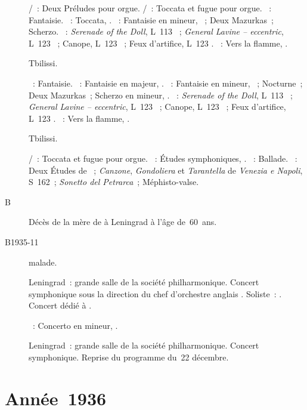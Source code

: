 \begin{description}
 \textsc{\JBach{}/\Ziloti{}}~: Deux Préludes pour orgue.
 \textsc{\JBach{}/\Busoni{}}~: Toccata et fugue pour orgue.
 \textsc{\Mozart{}}~: Fantaisie.
 \textsc{\Schumann{}}~: Toccata, .
 \textsc{\Chopin{}}~: Fantaisie en \kF mineur, ~; Deux Mazurkas~;
 Scherzo.
 \textsc{\Debussy{}}~: \emph{Serenade of the Doll}, L~113 ~;
 \emph{General Lavine -- eccentric}, L~123 ~; Canope, L~123
 ~; Feux d'artifice, L~123 .
 \textsc{\Scriabine{}}~: Vers la flamme, .
 \item[\DateWithWeekDay{1935-10-27}]
 Tbilissi.

 \textsc{\Mozart{}}~: Fantaisie.
 \textsc{\Schumann{}}~: Fantaisie en \kC majeur, .
 \textsc{\Chopin{}}~: Fantaisie en \kF mineur, ~; Nocturne~; Deux
 Mazurkas~; Scherzo en \kB mineur, .
 \textsc{\Debussy{}}~: \emph{Serenade of the Doll}, L~113 ~;
 \emph{General Lavine -- eccentric}, L~123 ~; Canope, L~123
 ~; Feux d'artifice, L~123 .
 \textsc{\Scriabine{}}~: Vers la flamme, .
 \item[\DateWithWeekDay{1935-10-30}]
 Tbilissi.

 \textsc{\JBach{}/\Busoni{}}~: Toccata et fugue pour orgue.
 \textsc{\Schumann{}}~: Études symphoniques, .
 \textsc{\Chopin{}}~: Ballade.
 \textsc{\Liszt{}}~: Deux Études de \Paganini{}~; \emph{Canzone},
 \emph{Gondoliera} et \emph{Tarantella} de \emph{Venezia e Napoli}, S~162~;
 \emph{Sonetto del Petrarca}~; Méphisto-valse.
 \item[B\DateWithWeekDay{1935-10-31}]
 Décès de la mère de \VSofronitsky{} à Leningrad à l'âge de~60~ans.
 \item[B1935-11]
 \VSofronitsky{} malade.
 \item[\DateWithWeekDay{1935-12-22}]
 Leningrad~: grande salle de la société philharmonique.
 Concert symphonique sous la direction du chef d'orchestre anglais
 \ACoates{}.
 Soliste~: \VSofronitsky{}.
 Concert dédié à \ESofronitskaya{}.

 \textsc{\Scriabine{}}~: Concerto en \kF \Sharp mineur, .
 \item[\DateWithWeekDay{1935-12-24}]
 Leningrad~: grande salle de la société philharmonique.
 Concert symphonique.
 Reprise du programme du~22 décembre.
\end{description}

\section{Année~1936}

